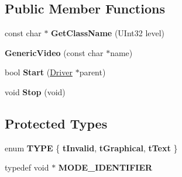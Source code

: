 \subsection*{Public Member Functions}
\begin{DoxyCompactItemize}
\item 
\mbox{\label{class_generic_video_a3d88f7c2dbf327b2f5bf5ad0312cdc9b}} 
const char $\ast$ {\bfseries Get\+Class\+Name} (U\+Int32 level)
\item 
\mbox{\label{class_generic_video_a6d7ea217635188d4f4595b2552ffefbd}} 
{\bfseries Generic\+Video} (const char $\ast$name)
\item 
\mbox{\label{class_generic_video_a7f601466f4431a15ccbe5892e4f3a980}} 
bool {\bfseries Start} (\hyperlink{class_driver}{Driver} $\ast$parent)
\item 
\mbox{\label{class_generic_video_ac20f42bb81a05caaf029c40fd131e0ec}} 
void {\bfseries Stop} (void)
\end{DoxyCompactItemize}
\subsection*{Protected Types}
\begin{DoxyCompactItemize}
\item 
\mbox{\label{class_generic_video_a3ff8211afd1d1e51e4bfbeb2e7f9e072}} 
enum {\bfseries T\+Y\+PE} \{ {\bfseries t\+Invalid}, 
{\bfseries t\+Graphical}, 
{\bfseries t\+Text}
 \}
\item 
\mbox{\label{class_generic_video_a2af21b082d10a16e6e36a7bcb13f9691}} 
typedef void $\ast$ {\bfseries M\+O\+D\+E\+\_\+\+I\+D\+E\+N\+T\+I\+F\+I\+ER}
\end{DoxyCompactItemize}
